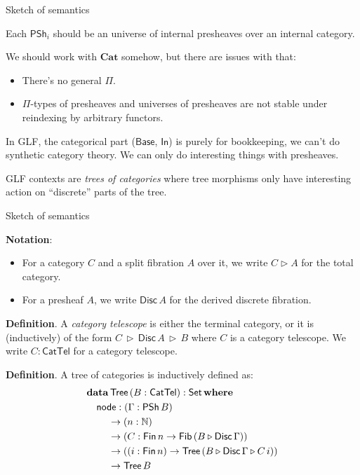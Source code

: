 \documentclass[dvipsnames,aspectratio=169]{beamer}
\newcommand{\ms}[1]{\mathsf{#1}}
\newcommand{\mbb}[1]{\mathbb{#1}}
\newcommand{\mbf}[1]{\mathbf{#1}}
\newcommand{\Set}{\mathsf{Set}}
\newcommand{\CatTel}{\mathsf{CatTel}}
\newcommand{\Fib}{\mathsf{Fib}}
\newcommand{\Fin}{\mathsf{Fin}}
\newcommand{\Tree}{\mathsf{Tree}}
\newcommand{\Disc}{\mathsf{Disc}}
\newcommand{\Base}{\mathsf{Base}}
\newcommand{\In}{\mathsf{In}}
\newcommand{\PSh}{\mathsf{PSh}}
\newcommand{\bCat}{\mathbf{Cat}}
\newcommand{\ext}{\triangleright}
\begin{document}
\begin{frame}{Sketch of semantics}

Each $\PSh_i$ should be an universe of internal presheaves over an internal category.
\vspace{1em}

We should work with $\bCat$ somehow, but there are issues with that:
\begin{itemize}
\item There's no general $\Pi$.
\item $\Pi$-types of presheaves and universes of presheaves are not stable under
      reindexing by arbitrary functors.
\end{itemize}
\vspace{1em}

In GLF, the categorical part ($\Base$, $\In$) is purely for bookkeeping, we can't do synthetic
category theory. We can only do interesting things with presheaves.
\vspace{1em}

GLF contexts are \emph{trees of categories} where tree morphisms only have interesting
action on ``discrete'' parts of the tree.

\end{frame}

\begin{frame}{Sketch of semantics}

\textbf{Notation}:
\begin{itemize}
\item For a category $C$ and a split fibration $A$ over it, we write $C \ext A$ for the total category.
\item For a presheaf $A$, we write $\Disc\,A$ for the derived discrete fibration.
\end{itemize}
\vspace{1em}

\textbf{Definition}. A \emph{category telescope} is either the terminal category, or it is
(inductively) of the form $C\,\ext\,\Disc\,A\,\ext\,B$ where $C$ is a category telescope. We write
$C : \CatTel$ for a category telescope.
\vspace{1em}

\textbf{Definition}. A tree of categories is inductively defined as:
\begin{alignat*}{3}
  & \mbf{data}\,\Tree\,(B : \CatTel) : \Set\,\mbf{where}\\
  & \hspace{1em} \ms{node} : (\Gamma : \PSh\,B)\\
  & \hspace{2.2em} \to  (n : \mbb{N})\\
  & \hspace{2.2em} \to  (C : \Fin\,n \to \Fib\,(B \ext \Disc\,\Gamma))\\
  & \hspace{2.2em} \to ((i : \Fin\,n) \to \Tree\,(B \ext \Disc\,\Gamma \ext C\,i))\\
  & \hspace{2.2em} \to \Tree\,B
\end{alignat*}

\end{frame}
\end{document}
